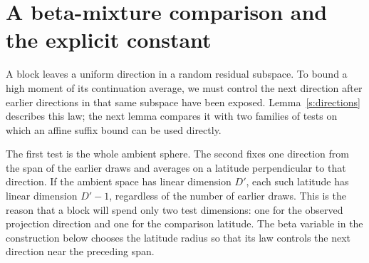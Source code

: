 \section{A beta-mixture comparison and the explicit constant}\label{s:beta-mixture}

A block leaves a uniform direction in a random residual subspace. To
bound a high moment of its continuation average, we must control the
next direction after earlier directions in that same subspace have
been exposed. Lemma~\ref{s:directions} describes this law; the next
lemma compares it with two families of tests on which an affine
suffix bound can be used directly.

The first test is the whole ambient sphere. The second fixes one
direction from the span of the earlier draws and averages on a
latitude perpendicular to that direction. If the ambient space has
linear dimension \(D'\), each such latitude has linear dimension
\(D'-1\), regardless of the number of earlier draws. This is the
reason that a block will spend only two test dimensions: one for the
observed projection direction and one for the comparison latitude.
The beta variable in the construction below chooses the latitude
radius so that its law controls the next direction near the preceding
span.

